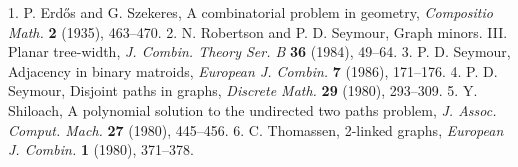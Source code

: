 
1. P. Erd\H{o}s and G. Szekeres, A combinatorial problem in geometry, \textit{Compositio Math.} \textbf{2} (1935), 463--470. 2. N. Robertson and P. D. Seymour, Graph minors. III. Planar tree-width, \textit{J. Combin. Theory Ser. B} \textbf{36} (1984), 49--64. 3. P. D. Seymour, Adjacency in binary matroids, \textit{European J. Combin.} \textbf{7} (1986), 171--176. 4. P. D. Seymour, Disjoint paths in graphs, \textit{Discrete Math.} \textbf{29} (1980), 293--309. 5. Y. Shiloach, A polynomial solution to the undirected two paths problem, \textit{J. Assoc. Comput. Mach.} \textbf{27} (1980), 445--456. 6. C. Thomassen, 2-linked graphs, \textit{European J. Combin.} \textbf{1} (1980), 371--378.
